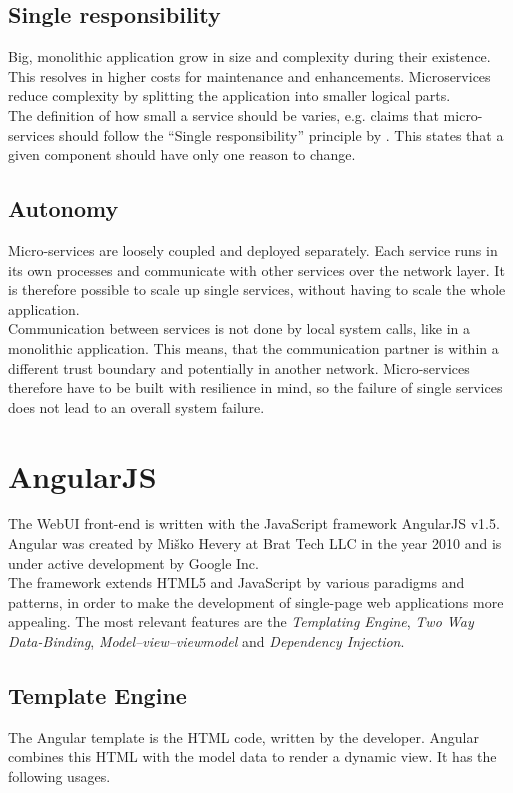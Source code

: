 \subsection{Single responsibility}
Big, monolithic application grow in size and complexity during their existence. This resolves in higher costs for maintenance and enhancements. Microservices reduce complexity by splitting the application into smaller logical parts.\\
The definition of how small a service should be varies, \cite{newman2015building} e.g. claims that micro-services should follow the \enquote{Single responsibility} principle by \cite{martin2003agile}. This states that a given component should have only one reason to change.


\subsection{Autonomy}
Micro-services are loosely coupled and deployed separately. Each service runs in its own processes and communicate with other services over the network layer. It is therefore possible to scale up single services, without having to scale the whole application.\\
Communication between services is not done by local system calls, like in a monolithic application. This means, that the communication partner is within a different trust boundary and potentially in another network. Micro-services therefore have to be built with resilience in mind, so the failure of single services does not lead to an overall system failure.



\section{AngularJS}
\label{sec:angularjs}
The WebUI front-end is written with the JavaScript framework AngularJS v1.5. Angular was created by Miško Hevery at Brat Tech LLC in the year 2010 and is under active development by Google Inc. \\
The framework extends HTML5 and JavaScript by various paradigms and patterns, in order to make the development of single-page web applications more appealing. The most relevant features are the \textit{Templating Engine}, \textit{Two Way Data-Binding}, \textit{Model–view–viewmodel} and \textit{Dependency Injection}.


\subsection{Template Engine}
The Angular template is the HTML code, written by the developer. Angular combines this HTML with the model data to render a dynamic view. It has the following usages.

